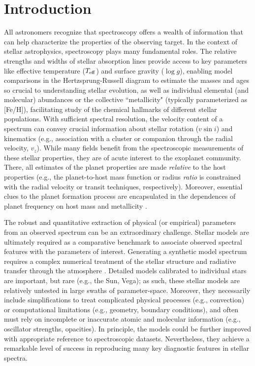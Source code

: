 \documentclass[iop,floatfix,numberedappendix,twocolappendix]{emulateapj}
\begin{document}
\section{Introduction} \label{sec:intro}

All astronomers recognize that spectroscopy offers a wealth of information that can help
characterize the properties of the observing target.  In the context of stellar astrophysics,
spectroscopy plays many fundamental roles.  The relative strengths and widths of stellar absorption
lines provide access to key parameters like effective temperature ($T_{\rm eff}$) and surface
gravity ($\log g$), enabling model comparisons in the Hertzsprung-Russell diagram to estimate the
masses and ages so crucial to understanding stellar evolution, as well as individual elemental (and
molecular) abundances or the collective ``metallicity" (typically parameterized as [Fe/H]),
facilitating study of the chemical hallmarks of different stellar populations.  With sufficient
spectral resolution, the velocity content of a spectrum can convey crucial information about stellar
rotation ($v \sin i$) and kinematics (e.g., association with a cluster or companion through the
radial velocity, $v_z$).  While many fields benefit from the spectroscopic measurements of these
stellar properties, they are of acute interest to the exoplanet community.  There, all estimates of
the planet properties are made {\it relative} to the host properties (e.g., the planet-to-host mass
function or radius {\it ratio} is constrained with the radial velocity or transit techniques,
respectively).  Moreover, essential clues to the planet formation process are encapsulated in the
dependences of planet frequency on host mass \citep[e.g.,][]{johnson07,howard10} and metallicity
\citep[e.g.,][]{fischer05,buchhave14}.   

The robust and quantitative extraction of physical (or empirical) parameters from an 
observed spectrum can be an extraordinary challenge.  Stellar models are ultimately required as a 
comparative benchmark to associate observed spectral features with the parameters of interest.  
Generating a synthetic model spectrum requires a complex numerical treatment of the stellar 
structure and radiative transfer through the atmosphere \citep[e.g.,][]{kurucz93,castelli04,
hauschildt99,husser13,paxton11}.  Detailed models calibrated to individual stars are important, but 
rare (e.g., the Sun, Vega); as such, these stellar models are relatively untested in large swaths 
of parameter-space.  Moreover, they necessarily include simplifications to treat complicated 
physical processes (e.g., convection) or computational limitations (e.g., geometry, boundary 
conditions), and often must rely on incomplete or inaccurate atomic and molecular information 
(e.g., oscillator strengths, opacities).  In principle, the models could be further improved with 
appropriate reference to spectroscopic datasets.  Nevertheless, they achieve a remarkable level of 
success in reproducing many key diagnostic features in stellar spectra.  
\end{document}
